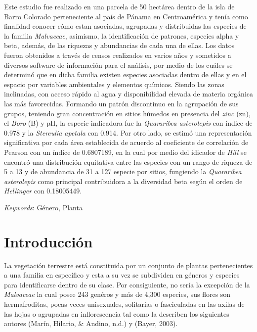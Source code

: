 \documentclass[11pt,]{article}
\renewenvironment{abstract}
 {{%
    \setlength{\leftmargin}{0mm}
    \setlength{\rightmargin}{\leftmargin}%
  }%
  \relax}
 {\endlist}
\begin{document}
\begin{abstract}

    \hbox{\vrule height .2pt width 39.14pc}

    \vskip 8.5pt %

\noindent Este estudio fue realizado en una parcela de 50 hectárea dentro de la
isla de Barro Colorado perteneciente al país de Pánama en Centroamérica
y tenía como finalidad conocer cómo estan asociadas, agrupadas y
distribuidas las especies de la familia \emph{Malvaceae}, asimismo, la
identificación de patrones, especies alpha y beta, además, de las
riquezas y abundancias de cada una de ellas. Los datos fueron obtenidos
a través de censos realizados en varios años y sometidos a diversos
software de información para el análisis, por medio de los cuáles se
determinó que en dicha familia existen especies asociadas dentro de
ellas y en el espacio por variables ambientales y elementos químicos.
Siendo las zonas inclinadas, con acceso rápido al agua y disponibilidad
elevada de materia orgánica las más favorecidas. Formando un patrón
discontinuo en la agrupación de sus grupos, teniendo gran concentración
en sitios húmedos en presencia del \emph{zinc} (zn), el \emph{Boro} (B)
y pH, la especie indicadora fue la \emph{Quararibea asterolepis} con
índice de 0.978 y la \emph{Sterculia apetala} con 0.914. Por otro lado,
se estimó una representación significativa por cada área establecida de
acuerdo al coeficiente de correlación de Pearson con un índice de
0.6807189, en la cual por medio del idicador de \emph{Hill} se encontró
una distribución equitativa entre las especies con un rango de riqueza
de 5 a 13 y de abundancia de 31 a 127 especie por sitios, fungiendo la
\emph{Quararibea asterolepis} como principal contribuidora a la
diversidad beta según el orden de \emph{Hellinger} con 0.18005449.


\vskip 8.5pt \noindent \emph{Keywords}: Género, Planta \par

    \hbox{\vrule height .2pt width 39.14pc}



\end{abstract}


\vskip 6.5pt


\noindent  \section{Introducción}\label{introducciuxf3n}

La vegetación terrestre está constituida por un conjunto de plantas
pertenecientes a una familia en específico y esta a su vez se subdividen
en géneros y especies para identificarse dentro de su clase. Por
consiguiente, no sería la excepción de la \emph{Malvaceae} la cual posee
243 genéros y más de 4,300 especies, sus flores son hermafroditas, pocas
veces unisexuales, solitarias o fasciculadas en las axilas de las hojas
o agrupadas en inflorescencia tal como la describen los siguientes
autores (Marín, Hilario, \& Andino, n.d.) y (Bayer, 2003).
\end{document}
